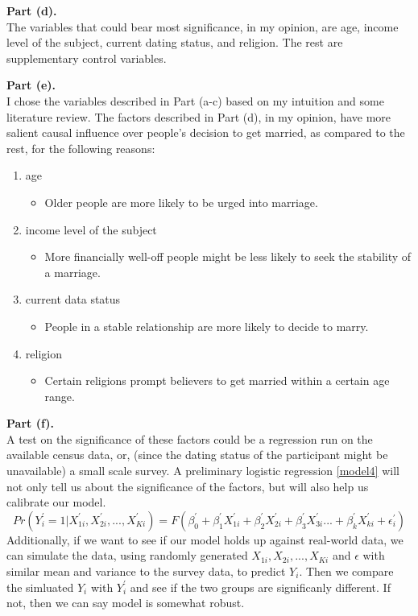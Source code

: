 \documentclass[letterpaper,12pt]{article}
\theoremstyle{definition}
\begin{document}
\textbf{Part (d).} \\
The variables that could bear most significance, in my opinion, are age, income level of the subject, current dating status, and religion. The rest are supplementary control variables.

\textbf{Part (e).} \\
I chose the variables described in Part (a-c) based on my intuition and some literature review. The factors described in Part (d), in my opinion, have more salient causal influence over people's decision to get married, as compared to the rest, for the following reasons:

\begin{enumerate}
	\item age
	\begin{itemize}
		\item Older people are more likely to be urged into marriage.
	\end{itemize}
	\item income level of the subject
	\begin{itemize}
		\item More financially well-off people might be less likely to seek the stability of a marriage.
	\end{itemize}
	\item current data status
	\begin{itemize}
		\item People in a stable relationship are more likely to decide to marry.
	\end{itemize}
	\item religion
	\begin{itemize}
		\item Certain religions prompt believers to get married within a certain age range. 
	\end{itemize}
\end{enumerate}


\textbf{Part (f).} \\
A test on the significance of these factors could be a regression run on the available census data, or, (since the dating status of the participant might be unavailable) a small scale survey. A preliminary logistic regression \eqref{model4} will not only tell us about the significance of the factors, but will also help us calibrate our model. 
\begin{equation} \label{model4}
Pr(Y_i^{'}=1|X_{1i}^{'}, X_{2i}^{'}, ..., X_{Ki}^{'}) = F(\beta_0^{'}+\beta_1^{'} X_{1i}^{'}+\beta_{2}^{'} X_{2i}^{'}+ \beta_{3}^{'} X_{3i}^{'} ... + \beta_{k}^{'} X_{ki}^{'} + \epsilon_i^{'})
\end{equation}
Additionally, if we want to see if our model holds up against real-world data, we can simulate the data, using randomly generated $X_{1i}, X_{2i}, ..., X_{Ki}$ and $\epsilon$ with similar mean and variance to the survey data, to predict $Y_i$. Then we compare the simluated $Y_i$ with $Y_i^{'}$ and see if the two groups are significanly different. If not, then we can say model is somewhat robust.
\end{document}
